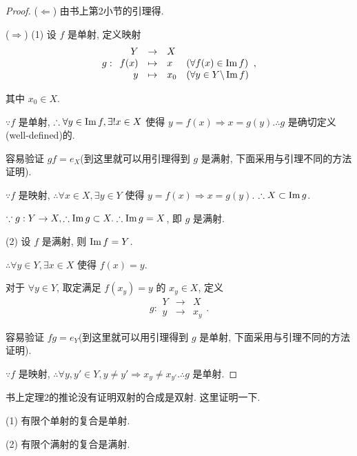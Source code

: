 \documentclass[color=black,device=normal,lang=cn,mode=geye]{elegantnote}
\begin{document}
\begin{proof}
    ($\Leftarrow$) 由书上第2小节的引理得.
    
    ($\Rightarrow$) (1) 设 $f$ 是单射, 定义映射
    \[g:\begin{array}{rcll}
    Y & \to & X \\
    f(x) & \mapsto & x & (\forall f(x)\in\operatorname{Im} f) \\
    y & \mapsto & x_0 & (\forall y\in Y\backslash\operatorname{Im} f)
    \end{array},\]

    其中 $x_0\in X$.

    $\because f$ 是单射, $\therefore\forall y\in\operatorname{Im} f,\exists!x\in X$ 使得 $y=f(x)\Rightarrow x=g(y).\therefore g$ 是确切定义(well-defined)的.

    容易验证 $gf=e_X$(到这里就可以用引理得到 $g$ 是满射, 下面采用与引理不同的方法证明).

    $\because f$ 是映射, $\therefore\forall x\in X,\exists y\in Y$ 使得 $y=f(x)\Rightarrow x=g(y)$. $\therefore X\subset\operatorname{Im} g$.

    $\because g:Y\to X,\therefore\operatorname{Im} g\subset X.\therefore\operatorname{Im} g=X$, 即 $g$ 是满射.

    (2) 设 $f$ 是满射, 则 $\operatorname{Im} f=Y$.

    $\therefore\forall y\in Y,\exists x\in X$ 使得 $f(x)=y$.

    对于 $\forall y\in Y$, 取定满足 $f(x_y)=y$ 的 $x_y\in X$, 定义
    \[g:\begin{array}{rcl}
    Y & \to & X \\
    y & \to & x_y
    \end{array}.\]

    容易验证 $fg=e_Y$(到这里就可以用引理得到 $g$ 是单射, 下面采用与引理不同的方法证明).

    $\because f$ 是映射, $\therefore\forall y,y'\in Y,y\neq y'\Rightarrow x_y\neq x_{y'}.\therefore g$ 是单射.
\end{proof}
书上定理2的推论没有证明双射的合成是双射. 这里证明一下.
\begin{theorem}
    (1) 有限个单射的复合是单射.
    
    (2) 有限个满射的复合是满射.
\end{theorem}
\end{document}
